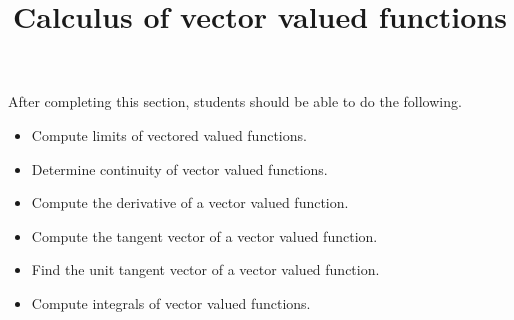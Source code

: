 \documentclass{ximera}
\title{Calculus of vector valued functions}
\begin{document}
\begin{abstract}
\end{abstract}

\maketitle

\begin{sectionOutcomes}

After completing this section, students should be able to do the following.

\begin{itemize}
\item Compute limits of vectored valued functions.
\item Determine continuity of vector valued functions. 
\item Compute the derivative of a vector valued function. 
\item Compute the tangent vector of a vector valued function.
\item Find the unit tangent vector of a vector valued function.
\item Compute integrals of vector valued functions.
\end{itemize}

\end{sectionOutcomes}
\end{document}
